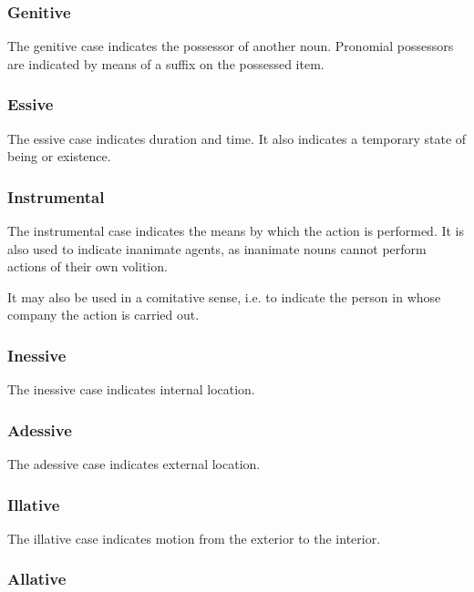 \documentclass[grammar]{subfiles}
\begin{document}
  \subsubsection{Genitive}
  \label{nm_genitive_case}

  The genitive case indicates the possessor of another noun.  Pronomial
  possessors are indicated by means of a suffix on the possessed item.

  \subsubsection{Essive}
  \label{nm_essive_case}

  The essive case indicates duration and time.  It also indicates a
  temporary state of being or existence.

  \subsubsection{Instrumental}
  \label{nm_instrumental_case}

  The instrumental case indicates the means by which the action is
  performed.  It is also used to indicate inanimate agents, as
  inanimate nouns cannot perform actions of their own volition.  
  
  It may also be used in a comitative sense, i.e. to indicate the
  person in whose company the action is carried out.


  \subsubsection{Inessive}
  \label{nm_inessive_case}

  The inessive case indicates internal location. 

  \subsubsection{Adessive}
  \label{nm_adessive_case}

  The adessive case indicates external location.

  \subsubsection{Illative}
  \label{nm_illative_case}

  The illative case indicates motion from the exterior to the interior.

  \subsubsection{Allative}
  \label{nm_allative_case}
\end{document}
